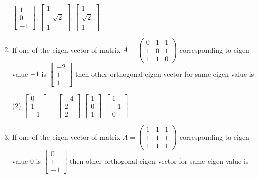 \begin{enumerate}
\begin{tasks}
		\task[\textbf{d.}]  $\left[\begin{array}{c}1 \\ 0 \\ -1\end{array}\right],\left[\begin{array}{c}1 \\ -\sqrt{2} \\ 1\end{array}\right],\left[\begin{array}{c}1 \\ \sqrt{2} \\ 1\end{array}\right]$
	\end{tasks}
	\item If one of the eigen vector of matrix $A=\left(\begin{array}{lll}0 & 1 & 1 \\ 1 & 0 & 1 \\ 1 & 1 & 0\end{array}\right)$ corresponding to eigen value $-1$ is $\left[\begin{array}{c}-2 \\ 1 \\ 1\end{array}\right]$ then other orthogonal eigen vector for same eigen value is
	 \begin{tasks}(2)
		\task[\textbf{a.}]$\left[\begin{array}{c}0 \\ 1 \\ -1\end{array}\right] \quad$
		\task[\textbf{b.}]$\left[\begin{array}{c}-4 \\ 2 \\ 2\end{array}\right]$
		\task[\textbf{c.}]$\left[\begin{array}{l}1 \\ 0 \\ 1\end{array}\right]$
		\task[\textbf{d.}] $\left[\begin{array}{c}1 \\ -1 \\ 0\end{array}\right]$
	\end{tasks}
	\item If one of the eigen vector of matrix $A=\left(\begin{array}{lll}1 & 1 & 1 \\ 1 & 1 & 1 \\ 1 & 1 & 1\end{array}\right)$ corresponding to eigen value 0 is $\left[\begin{array}{c}0 \\ 1 \\ -1\end{array}\right]$ then other orthogonal eigen vector for same eigen value is

\end{enumerate}
